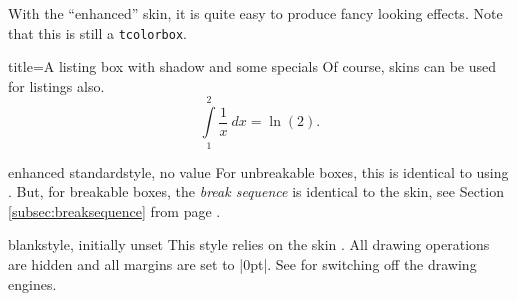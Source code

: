 \begin{dispExample}
\end{dispExample}

\clearpage

\begin{dispExample}

\begin{tcolorbox}[title=Nice box in rainbow colors]
  With the \enquote{enhanced} skin, it is quite easy to produce fancy looking effects.
  \tcblower
  Note that this is still a \texttt{tcolorbox}.
\end{tcolorbox}
\end{dispExample}


\begin{dispExample}

\begin{tcblisting}{title=A listing box with shadow and some specials}
Of course, skins can be used for listings also.
\begin{equation}
  \int\limits_1^2 \frac{1}{x}~dx = \ln(2).
\end{equation}
\end{tcblisting}
\end{dispExample}


\clearpage


\begin{docTcbKey}{enhanced standard}{}{style, no value}
  For unbreakable boxes, this is identical to using .
  But, for breakable boxes, the \emph{break sequence} is identical to the  skin,
  see Section \ref{subsec:breaksequence} from page \pageref{subsec:breaksequence}.
\end{docTcbKey}


\begin{docTcbKey}{blank}{}{style, initially unset}
  This style relies on the skin . All drawing operations
  are hidden and all margins are set to |0pt|. See 
  for switching off the drawing engines.
\begin{dispExample}
\begin{tcolorbox}[blank,watermark text=A blank box]
\lipsum[1]
\end{tcolorbox}
\end{dispExample}
\end{docTcbKey}

